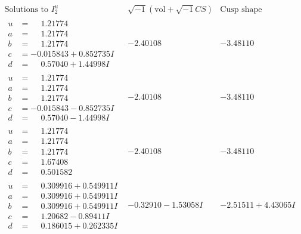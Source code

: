 \documentclass[1p]{elsarticle_modified}
\theoremstyle{definition}
\newcommand{\I}{\sqrt{-1}}
\begin{document}
$$\begin{array}{c|c|c}  
\text{Solutions to }I^u_{2}& \I (\text{vol} + \sqrt{-1}CS) & \text{Cusp shape}\\
 \hline 
\begin{aligned}
u &= \phantom{-}1.21774\phantom{ +0.000000I} \\
a &= \phantom{-}1.21774\phantom{ +0.000000I} \\
b &= \phantom{-}1.21774\phantom{ +0.000000I} \\
c &= -0.015843 + 0.852735 I \\
d &= \phantom{-}0.57040 + 1.44998 I\end{aligned}
 & -2.40108\phantom{ +0.000000I} & -3.48110\phantom{ +0.000000I} \\ \hline\begin{aligned}
u &= \phantom{-}1.21774\phantom{ +0.000000I} \\
a &= \phantom{-}1.21774\phantom{ +0.000000I} \\
b &= \phantom{-}1.21774\phantom{ +0.000000I} \\
c &= -0.015843 - 0.852735 I \\
d &= \phantom{-}0.57040 - 1.44998 I\end{aligned}
 & -2.40108\phantom{ +0.000000I} & -3.48110\phantom{ +0.000000I} \\ \hline\begin{aligned}
u &= \phantom{-}1.21774\phantom{ +0.000000I} \\
a &= \phantom{-}1.21774\phantom{ +0.000000I} \\
b &= \phantom{-}1.21774\phantom{ +0.000000I} \\
c &= \phantom{-}1.67408\phantom{ +0.000000I} \\
d &= \phantom{-}0.501582\phantom{ +0.000000I}\end{aligned}
 & -2.40108\phantom{ +0.000000I} & -3.48110\phantom{ +0.000000I} \\ \hline\begin{aligned}
u &= \phantom{-}0.309916 + 0.549911 I \\
a &= \phantom{-}0.309916 + 0.549911 I \\
b &= \phantom{-}0.309916 + 0.549911 I \\
c &= \phantom{-}1.20682 - 0.89411 I \\
d &= \phantom{-}0.186015 + 0.262335 I\end{aligned}
 & -0.32910 - 1.53058 I & -2.51511 + 4.43065 I \\ \hline\begin{aligned}

\end{aligned}
\end{array}$$
\end{document}
